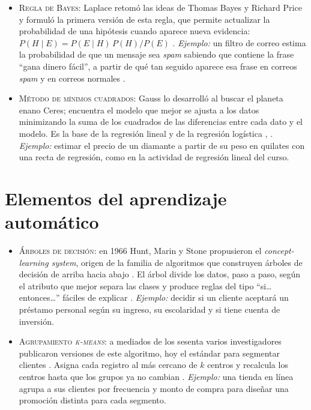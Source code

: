 \documentclass[12pt]{article}
\begin{document}
\begin{itemize}
    \item \textsc{Regla de Bayes}: Laplace retomó las ideas de Thomas Bayes y Richard Price y formuló la primera versión de esta regla, que permite actualizar la probabilidad de una hipótesis cuando aparece nueva evidencia: $P(H\mid E)=P(E\mid H)\,P(H)/P(E)$ \cite{1}. \emph{Ejemplo:} un filtro de correo estima la probabilidad de que un mensaje sea \emph{spam} sabiendo que contiene la frase ``gana dinero fácil'', a partir de qué tan seguido aparece esa frase en correos \emph{spam} y en correos normales \cite{3}.

    \item \textsc{Método de mínimos cuadrados}: Gauss lo desarrolló al buscar el planeta enano Ceres; encuentra el modelo que mejor se ajusta a los datos minimizando la suma de los cuadrados de las diferencias entre cada dato y el modelo. Es la base de la regresión lineal y de la regresión logística \cite{1}, \cite{3}. \emph{Ejemplo:} estimar el precio de un diamante a partir de su peso en quilates con una recta de regresión, como en la actividad de regresión lineal del curso.
\end{itemize}

\section{Elementos del aprendizaje automático}

\begin{itemize}
    \item \textsc{Árboles de decisión}: en 1966 Hunt, Marin y Stone propusieron el \emph{concept-learning system}, origen de la familia de algoritmos que construyen árboles de decisión de arriba hacia abajo \cite{1}. El árbol divide los datos, paso a paso, según el atributo que mejor separa las clases y produce reglas del tipo ``si\ldots{} entonces\ldots'' fáciles de explicar \cite{4}. \emph{Ejemplo:} decidir si un cliente aceptará un préstamo personal según su ingreso, su escolaridad y si tiene cuenta de inversión.

    \item \textsc{Agrupamiento \emph{k-means}}: a mediados de los sesenta varios investigadores publicaron versiones de este algoritmo, hoy el estándar para segmentar clientes \cite{1}. Asigna cada registro al más cercano de $k$ centros y recalcula los centros hasta que los grupos ya no cambian \cite{2}. \emph{Ejemplo:} una tienda en línea agrupa a sus clientes por frecuencia y monto de compra para diseñar una promoción distinta para cada segmento.
\end{itemize}
\end{document}
